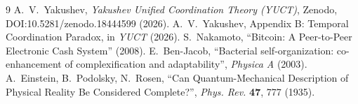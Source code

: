 \documentclass[12pt,a4paper]{article}
\begin{document}
	\begin{thebibliography}{9}
		 A.~V.~Yakushev, \emph{Yakushev Unified Coordination Theory (YUCT)}, Zenodo, DOI:10.5281/zenodo.18444599 (2026).
		 A.~V.~Yakushev, Appendix B: Temporal Coordination Paradox, in \emph{YUCT} (2026).
		 S.~Nakamoto, ``Bitcoin: A Peer-to-Peer Electronic Cash System'' (2008).
		 E.~Ben-Jacob, ``Bacterial self-organization: co-enhancement of complexification and adaptability'', \emph{Physica A} (2003).
		 A.~Einstein, B.~Podolsky, N.~Rosen, ``Can Quantum-Mechanical Description of Physical Reality Be Considered Complete?'', \emph{Phys. Rev.} \textbf{47}, 777 (1935).
	\end{thebibliography}
	
\end{document}

